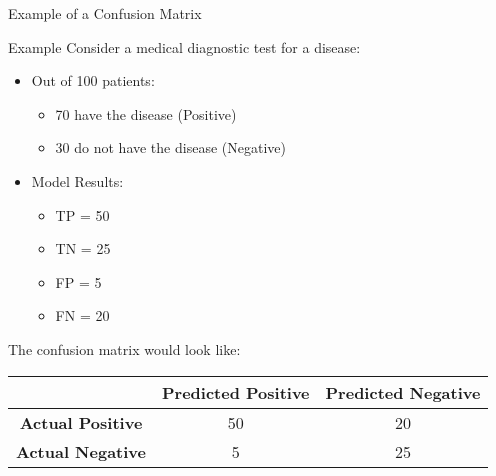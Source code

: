 \documentclass[aspectratio=169]{beamer}
\begin{document}
\begin{frame}[fragile]{Example of a Confusion Matrix}
    \begin{block}{Example}
        Consider a medical diagnostic test for a disease:
        \begin{itemize}
            \item Out of 100 patients:
                \begin{itemize}
                    \item 70 have the disease (Positive)
                    \item 30 do not have the disease (Negative)
                \end{itemize}
                
            \item Model Results:
                \begin{itemize}
                    \item TP = 50
                    \item TN = 25
                    \item FP = 5
                    \item FN = 20
                \end{itemize}
        \end{itemize}
        The confusion matrix would look like:
        \begin{center}
        \begin{tabular}{|c|c|c|}
            \hline
            & \textbf{Predicted Positive} & \textbf{Predicted Negative} \\
            \hline
            \textbf{Actual Positive} & 50 & 20 \\
            \hline
            \textbf{Actual Negative} & 5 & 25 \\
            \hline
        \end{tabular}
        \end{center}
    \end{block}
\end{frame}
\end{document}
